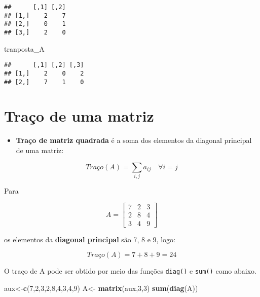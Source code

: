 \documentclass[
]{book}
\newenvironment{Shaded}{\begin{snugshade}}{\end{snugshade}}
\newcommand{\DecValTok}[1]{\textcolor[rgb]{0.00,0.00,0.81}{#1}}
\newcommand{\KeywordTok}[1]{\textcolor[rgb]{0.13,0.29,0.53}{\textbf{#1}}}
\newcommand{\NormalTok}[1]{#1}
\newcommand{\StringTok}[1]{\textcolor[rgb]{0.31,0.60,0.02}{#1}}
\providecommand{\tightlist}{%
  \setlength{\itemsep}{0pt}\setlength{\parskip}{0pt}}
\begin{document}
\begin{verbatim}
##      [,1] [,2]
## [1,]    2    7
## [2,]    0    1
## [3,]    2    0
\end{verbatim}

\begin{Shaded}
\begin{Highlighting}[]
\NormalTok{tranposta\_A}
\end{Highlighting}
\end{Shaded}

\begin{verbatim}
##      [,1] [,2] [,3]
## [1,]    2    0    2
## [2,]    7    1    0
\end{verbatim}

\hypertarget{trauxe7o-de-uma-matriz}{%
\section{Traço de uma matriz}\label{trauxe7o-de-uma-matriz}}

\begin{itemize}
\tightlist
\item
  \textbf{Traço de matriz quadrada} é a soma dos elementos da diagonal principal de uma matriz:
\end{itemize}

\begin{equation*}
Traço(A)= \sum_{i,j} a_{ij} \quad \forall i = j
\end{equation*}

Para

\begin{equation*}
A = 
\begin{bmatrix}
7 & 2 & 3\\
2 & 8 & 4\\
3 & 4 & 9
\end{bmatrix}
\end{equation*}

os elementos da \textbf{diagonal principal} são 7, 8 e 9, logo:

\begin{equation*}
Traço(A)= 7 + 8 + 9 = 24
\end{equation*}

O traço de A pode ser obtido por meio das funções \texttt{diag()} e \texttt{sum()} como abaixo.

\begin{Shaded}
\begin{Highlighting}[]
\NormalTok{aux\textless{}{-}}\KeywordTok{c}\NormalTok{(}\DecValTok{7}\NormalTok{,}\DecValTok{2}\NormalTok{,}\DecValTok{3}\NormalTok{,}\DecValTok{2}\NormalTok{,}\DecValTok{8}\NormalTok{,}\DecValTok{4}\NormalTok{,}\DecValTok{3}\NormalTok{,}\DecValTok{4}\NormalTok{,}\DecValTok{9}\NormalTok{)}
\NormalTok{A\textless{}{-}}\StringTok{ }\KeywordTok{matrix}\NormalTok{(aux,}\DecValTok{3}\NormalTok{,}\DecValTok{3}\NormalTok{)}
\KeywordTok{sum}\NormalTok{(}\KeywordTok{diag}\NormalTok{(A))}
\end{Highlighting}
\end{Shaded}
\end{document}
